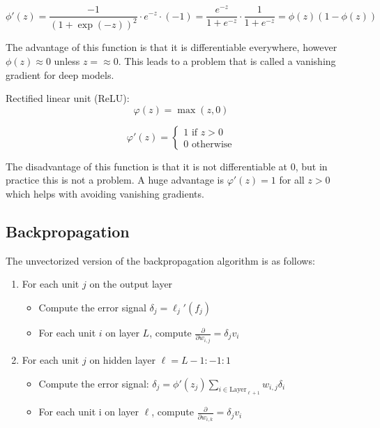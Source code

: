 \documentclass[a4paper,10pt,twoside]{article}
\begin{document}
\begin{equation*}
    \phi'(z)=\frac{-1}{(1+\exp(-z))^2}\cdot e^{-z}\cdot (-1)=\frac{e^{-z}}{1+e^{-z}}\cdot\frac{1}{1+e^{-z}}=\phi(z)(1-\phi(z))
\end{equation*}

The advantage of this function is that it is differentiable everywhere, however $\phi(z)\approx 0$ unless $z=\approx 0$. This leads to a problem that is called a vanishing gradient for deep models.

Rectified linear unit (ReLU):
\begin{equation*}
    \varphi(z)=\max(z,0)
\end{equation*}

\begin{equation*}
    \varphi'(z)=\begin{cases}
        1 \text{ if }z>0\\
        0 \text{ otherwise}
    \end{cases}
\end{equation*}

The disadvantage of this function is that it is not differentiable at 0, but in practice this is not a problem. A huge advantage is $\varphi'(z)=1$ for all $z>0$ which helps with avoiding vanishing gradients.

\subsection{Backpropagation}
The unvectorized version of the backpropagation algorithm is as follows:
\begin{enumerate}
    \item For each unit $j$ on the output layer
    \begin{itemize}
        \item Compute the error signal $\delta_j=\ell_j'(f_j)$
        \item For each unit $i$ on layer $L$, compute $\frac{\partial}{\partial w_{i,j}}=\delta_jv_i$
    \end{itemize}
    \item For each unit $j$ on hidden layer $\ell=L-1:-1:1$
    \begin{itemize}
        \item Compute the error signal: $\delta_j=\phi'(z_j)\sum_{i\in\text{Layer}_{\ell+1}}w_{i,j}\delta_i$
        \item For each unit i on layer $\ell$, compute $\frac{\partial}{\partial w_{i,k}}=\delta_{j}v_i$
    \end{itemize}
\end{enumerate}
\end{document}
